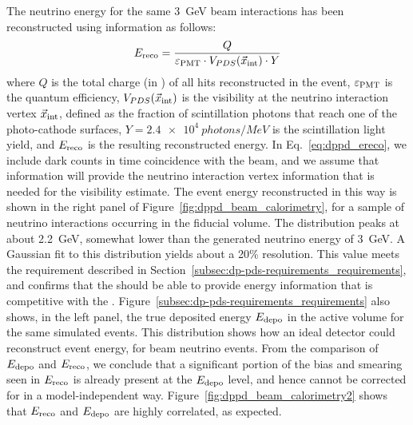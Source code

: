 The neutrino energy for the same \SI{3}{\GeV} beam \nue {} interactions has been reconstructed using  information as follows:
%
\begin{equation}
\label{eq:dppd_ereco} 
E_{\rm reco} = \frac{Q}{\varepsilon_{\rm PMT}\cdot V_{PDS}(\vec{x}_{\rm int})\cdot Y}
\end{equation}
%
\noindent where $Q$ is the total charge (in ) of all  hits reconstructed in the event, $\varepsilon_{\rm PMT}$ is the  quantum efficiency, $V_{PDS}(\vec{x}_{\rm int})$ is the  visibility at the neutrino interaction vertex $\vec{x}_{\rm int}$, defined as the fraction of \lar scintillation photons that reach one of the  photo-cathode surfaces, $Y=\SI{2.4e4}{photons/MeV}$ is the scintillation light yield, and $E_{\rm reco}$ is the resulting reconstructed energy. In Eq.~\ref{eq:dppd_ereco}, we include  dark counts in time coincidence with the beam, and we assume that  information will provide the neutrino interaction vertex information that is needed for the visibility estimate. The event energy reconstructed in this way is shown in the right panel of Figure~\ref{fig:dppd_beam_calorimetry}, for a sample of neutrino interactions occurring in the \lar fiducial volume. The distribution peaks at about \SI{2.2}{GeV}, somewhat lower than the generated neutrino energy of \SI{3}{GeV}. A Gaussian fit to this distribution yields about a \num{20}\% resolution. This value meets the requirement described in Section~\ref{subsec:dp-pds-requirements_requirements}, and confirms that the  should be able to provide energy information that is competitive with the \dune {}. Figure~\ref{subsec:dp-pds-requirements_requirements} also shows, in the left panel, the true deposited energy $E_{\rm depo}$ in the \lar active volume for the same simulated events. This distribution shows how an ideal detector could reconstruct event energy, for beam neutrino events. From the comparison of $E_{\rm depo}$ and $E_{\rm reco}$, we conclude that a significant portion of the bias and smearing seen in $E_{\rm reco}$ is already present at the $E_{\rm depo}$ level, and hence cannot be corrected for in a model-independent way. Figure~\ref{fig:dppd_beam_calorimetry2} shows that $E_{\rm reco}$ and $E_{\rm depo}$ are highly correlated, as expected. 

